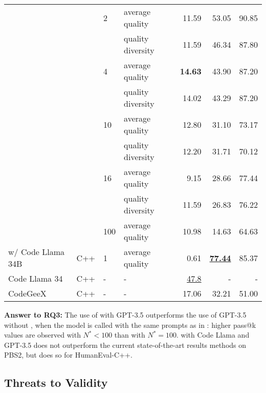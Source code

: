 \begin{table}
\begin{tabular}{llllrrr}
&        & 2   & average quality &   11.59 &    53.05 &     90.85 \\
&        &     & quality diversity  &   11.59 &    46.34 &     87.80 \\
&        & 4   & average quality &   \textbf{14.63} &    43.90 &     87.20 \\
&        &     & quality diversity  &   14.02 &    43.29 &     87.20 \\
&        & 10  & average quality &   12.80 &    31.10 &     73.17 \\
&        &     & quality diversity  &   12.20 &    31.71 &     70.12 \\
&        & 16  & average quality &    9.15 &    28.66 &     77.44 \\
&        &     & quality diversity  &   11.59 &    26.83 &     76.22 \\
&        & 100 & average quality &   10.98 &    14.63 &     64.63 \\
\midrule
\method{} w/ Code Llama 34B & C++ & 1 & average quality &    0.61 &    \underline{\textbf{77.44}} &     85.37 \\
\midrule
Code Llama 34 & C++ & - &  - &  \underline{47.8}  &  -   &    - \\
CodeGeeX & C++ & - &  - &  17.06  &  32.21   &    51.00 \\
\bottomrule
\end{tabular}
\end{table}

\begin{highlight}
\textbf{Answer to RQ3:} 
The use of \method{} with GPT-3.5 outperforms the use of GPT-3.5 without \method{}, when the model is called with the same prompts as in \method{}: higher pass@k values are observed with $N^*<100$ than with $N^*=100.$ \method{} with Code Llama and GPT-3.5 does not outperform the current state-of-the-art results methods on PBS2, but does so for HumanEval-C++. 
\end{highlight}

\newpage \subsection{Threats to Validity}
\label{sec:threats}



